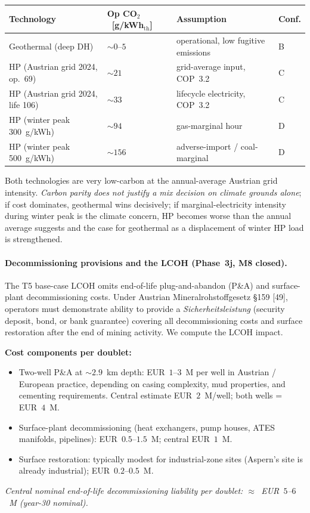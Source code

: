 \documentclass{article}
\begin{document}
\begin{center}
\begin{tabular}{llll}
\hline
\textbf{Technology} & \textbf{Op CO$_2$~[g/kWh$_{\mathrm{th}}$]} & \textbf{Assumption} & \textbf{Conf.} \\
\hline
Geothermal (deep DH)              & $\sim 0$--$5$  & operational, low fugitive emissions & B \\
HP (Austrian grid 2024, op.\ 69)  & $\sim 21$      & grid-average input, COP~3.2         & C \\
HP (Austrian grid 2024, life 106) & $\sim 33$      & lifecycle electricity, COP~3.2      & C \\
HP (winter peak 300~g/kWh)        & $\sim 94$      & gas-marginal hour                   & D \\
HP (winter peak 500~g/kWh)        & $\sim 156$     & adverse-import / coal-marginal      & D \\
\hline
\end{tabular}
\end{center}

Both technologies are very low-carbon at the annual-average
Austrian grid intensity. \emph{Carbon parity does not justify a
mix decision on climate grounds alone}; if cost dominates,
geothermal wins decisively; if marginal-electricity intensity
during winter peak is the climate concern, HP becomes worse than
the annual average suggests and the case for geothermal as a
displacement of winter HP load is strengthened.

\paragraph{Decommissioning provisions and the LCOH (Phase~3j, M8 closed).}
The T5 base-case LCOH omits end-of-life plug-and-abandon (P\&A) and
surface-plant decommissioning costs. Under Austrian Mineralrohstoffgesetz
§159 [49], operators must demonstrate ability to provide a
\emph{Sicherheitsleistung} (security deposit, bond, or bank guarantee)
covering all decommissioning costs and surface restoration after the
end of mining activity. We compute the LCOH impact.

\textbf{Cost components per doublet:}
\begin{itemize}
\item Two-well P\&A at $\sim 2.9$~km depth: EUR~$1$--$3$~M per well in
Austrian / European practice, depending on casing complexity, mud
properties, and cementing requirements. Central estimate
EUR~$2$~M/well; both wells = EUR~$4$~M.
\item Surface-plant decommissioning (heat exchangers, pump houses,
ATES manifolds, pipelines): EUR~$0.5$--$1.5$~M; central EUR~$1$~M.
\item Surface restoration: typically modest for industrial-zone
sites (Aspern's site is already industrial); EUR~$0.2$--$0.5$~M.
\end{itemize}
\emph{Central nominal end-of-life decommissioning liability per
doublet: $\approx$~EUR~$5$--$6$~M (year-30 nominal).}
\end{document}
